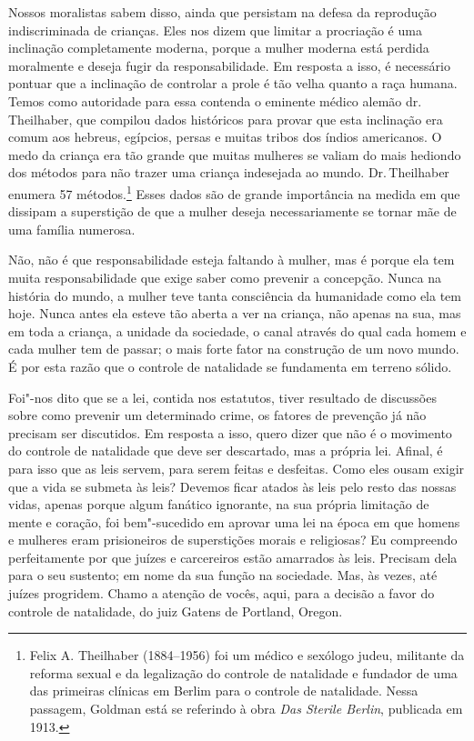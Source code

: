 Nossos moralistas sabem disso, ainda que persistam na defesa da
reprodução indiscriminada de crianças. Eles nos dizem que limitar a
procriação é uma inclinação completamente moderna, porque a mulher
moderna está perdida moralmente e deseja fugir da responsabilidade. Em
resposta a isso, é necessário pontuar que a inclinação de controlar a
prole é tão velha quanto a raça humana. Temos como autoridade para essa
contenda o eminente médico alemão dr.\,Theilhaber, que compilou dados
históricos para provar que esta inclinação era comum aos hebreus,
egípcios, persas e muitas tribos dos índios americanos. O medo da
criança era tão grande que muitas mulheres se valiam do mais hediondo
dos métodos para não trazer uma criança indesejada ao mundo. Dr.\,Theilhaber enumera 57 métodos.\footnote{Felix A.
  Theilhaber (1884--1956) foi um médico e sexólogo judeu, militante da
  reforma sexual e da legalização do controle de natalidade e fundador
  de uma das primeiras clínicas em Berlim para o controle de natalidade.
  Nessa passagem, Goldman está se referindo à obra \textit{Das Sterile
  Berlin}, publicada em 1913.} Esses dados são de grande importância na
medida em que dissipam a superstição de que a mulher deseja necessariamente se tornar mãe
de uma família numerosa.

Não, não é que responsabilidade esteja faltando à mulher, mas é porque
ela tem muita responsabilidade que exige saber como prevenir a
concepção. Nunca na história do mundo, a mulher teve tanta consciência
da humanidade como ela tem hoje. Nunca antes ela esteve tão aberta a ver
na criança, não apenas na sua, mas em toda a criança, a unidade da
sociedade, o canal através do qual cada homem e cada mulher tem de
passar; o mais forte fator na construção de um novo mundo. É por esta
razão que o controle de natalidade se fundamenta em terreno sólido.

Foi"-nos dito que se a lei, contida nos estatutos, tiver resultado de
discussões sobre como prevenir um determinado crime, os fatores de
prevenção já não precisam ser discutidos. Em resposta a isso, quero
dizer que não é o movimento do controle de natalidade que deve ser
descartado, mas a própria lei. Afinal, é para isso que as leis servem,
para serem feitas e desfeitas. Como eles ousam exigir que a vida se
submeta às leis? Devemos ficar atados às leis pelo resto das nossas
vidas, apenas porque algum fanático ignorante, na sua própria limitação
de mente e coração, foi bem"-sucedido em aprovar uma lei na época em que
homens e mulheres eram prisioneiros de superstições morais e religiosas?
Eu compreendo perfeitamente por que juízes e carcereiros estão amarrados
às leis. Precisam dela para o seu sustento; em nome da sua função na
sociedade. Mas, às vezes, até juízes progridem. Chamo a atenção de
vocês, aqui, para a decisão a favor do controle de natalidade, do juiz
Gatens de Portland, Oregon. 

